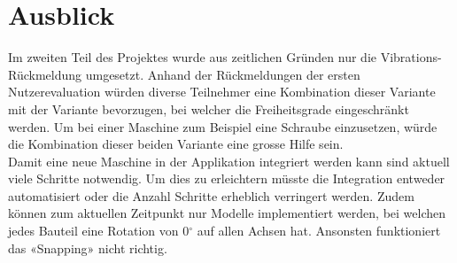 \chapter{Ausblick}
\label{ch:Ausblick}

Im zweiten Teil des Projektes wurde aus zeitlichen Gründen nur die Vibrations-Rückmeldung umgesetzt. Anhand der Rückmeldungen der ersten Nutzerevaluation würden diverse Teilnehmer eine Kombination dieser Variante mit der Variante bevorzugen, bei welcher die Freiheitsgrade eingeschränkt werden. Um bei einer Maschine zum Beispiel eine Schraube einzusetzen, würde die Kombination dieser beiden Variante eine grosse Hilfe sein. \\

\noindent Damit eine neue Maschine in der Applikation integriert werden kann sind aktuell viele Schritte notwendig. Um dies zu erleichtern müsste die Integration entweder automatisiert oder die Anzahl Schritte erheblich verringert werden. Zudem können zum aktuellen Zeitpunkt nur Modelle implementiert werden, bei welchen jedes Bauteil eine Rotation von 0$^{\circ}$ auf allen Achsen hat. Ansonsten funktioniert das «Snapping» nicht richtig.
